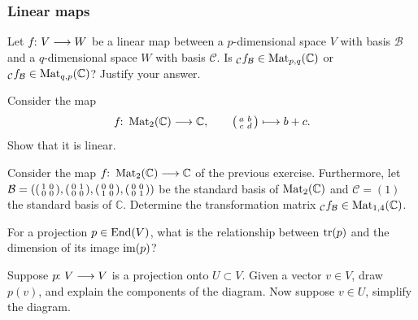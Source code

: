 \documentclass[a4paper, oneside, 12pt]{amsart}
\begin{document}
\subsubsection*{Linear maps}
\begin{thmlist}
  \item Let \(f\from V \to W\) be a linear map between a \(p\)-dimensional space \(V\) with basis \(\mathcal{B}\) and a \(q\)-dimensional space \(W\) with basis \(\mathcal{C}\).
  Is \(_{\mathcal{C}}f_{\mathcal{B}} \in \operatorname{Mat}_{p,q}( \mathbb{C})\) or \(_{\mathcal{C}}f_{\mathcal{B}} \in \operatorname{Mat}_{q,p}( \mathbb{C})\)?
  Justify your answer.
  \item Consider the  map
  \begin{equation*}
    f \from \Mat_2(\mathbb{C}) \to \mathbb{C}, \qquad
    \begin{psmallmatrix}
      a & b \\
      c & d
    \end{psmallmatrix}
    \mapsto
    b+c.
  \end{equation*}
  Show that it is linear.
  \item Consider the map \(f \from \Mat_{2} ( \mathbb{C}) \to \mathbb{C}\) of the previous exercise.
  Furthermore, let \(\mathcal{B} = \left(
    \begin{psmallmatrix}
      1 & 0 \\ 0 & 0
    \end{psmallmatrix},
    \begin{psmallmatrix}
      0 & 1 \\ 0 & 0
    \end{psmallmatrix},
    \begin{psmallmatrix}
      0 & 0 \\ 1 & 0
    \end{psmallmatrix},
    \begin{psmallmatrix}
      0 & 0 \\ 0 & 1
    \end{psmallmatrix}
  \right)\) be the standard basis of \(\operatorname{Mat}_2(\mathbb{C})\) and \( \mathcal{C}= (1)\)  the standard basis of \( \mathbb{C}\).
  Determine the transformation matrix \(_{ \mathcal{C}}f_{\mathcal{B}}\in \operatorname{Mat}_{1,4}( \mathbb{C})\).
  \item For a projection \(p \in \operatorname{End}(V)\), what is the relationship between \(\operatorname{tr}(p)\) and the dimension of its image \(\operatorname{im}(p)\)?
  \item Suppose \(p\from V\to V\) is a projection onto \(U\subset V\). Given a vector \(v\in V\), draw \(p(v)\),
  and explain the components of the diagram. Now suppose \(v\in U\), simplify the diagram.
\end{thmlist}
\cleardoublepage
\end{document}
